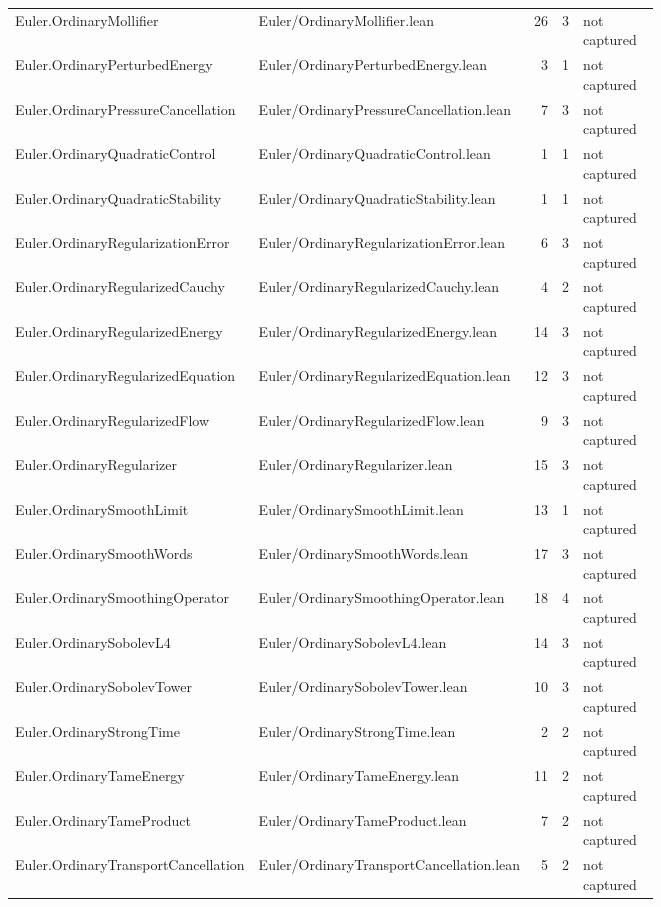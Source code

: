 \documentclass[10pt]{article}
\begin{document}
\begin{longtable}{p{0.28\linewidth}p{0.27\linewidth}r r p{0.20\linewidth}}
Euler.OrdinaryMollifier & Euler/OrdinaryMollifier.lean & 26 & 3 & not captured\\
Euler.OrdinaryPerturbedEnergy & Euler/OrdinaryPerturbedEnergy.lean & 3 & 1 & not captured\\
Euler.OrdinaryPressureCancellation & Euler/OrdinaryPressureCancellation.lean & 7 & 3 & not captured\\
Euler.OrdinaryQuadraticControl & Euler/OrdinaryQuadraticControl.lean & 1 & 1 & not captured\\
Euler.OrdinaryQuadraticStability & Euler/OrdinaryQuadraticStability.lean & 1 & 1 & not captured\\
Euler.OrdinaryRegularizationError & Euler/OrdinaryRegularizationError.lean & 6 & 3 & not captured\\
Euler.OrdinaryRegularizedCauchy & Euler/OrdinaryRegularizedCauchy.lean & 4 & 2 & not captured\\
Euler.OrdinaryRegularizedEnergy & Euler/OrdinaryRegularizedEnergy.lean & 14 & 3 & not captured\\
Euler.OrdinaryRegularizedEquation & Euler/OrdinaryRegularizedEquation.lean & 12 & 3 & not captured\\
Euler.OrdinaryRegularizedFlow & Euler/OrdinaryRegularizedFlow.lean & 9 & 3 & not captured\\
Euler.OrdinaryRegularizer & Euler/OrdinaryRegularizer.lean & 15 & 3 & not captured\\
Euler.OrdinarySmoothLimit & Euler/OrdinarySmoothLimit.lean & 13 & 1 & not captured\\
Euler.OrdinarySmoothWords & Euler/OrdinarySmoothWords.lean & 17 & 3 & not captured\\
Euler.OrdinarySmoothingOperator & Euler/OrdinarySmoothingOperator.lean & 18 & 4 & not captured\\
Euler.OrdinarySobolevL4 & Euler/OrdinarySobolevL4.lean & 14 & 3 & not captured\\
Euler.OrdinarySobolevTower & Euler/OrdinarySobolevTower.lean & 10 & 3 & not captured\\
Euler.OrdinaryStrongTime & Euler/OrdinaryStrongTime.lean & 2 & 2 & not captured\\
Euler.OrdinaryTameEnergy & Euler/OrdinaryTameEnergy.lean & 11 & 2 & not captured\\
Euler.OrdinaryTameProduct & Euler/OrdinaryTameProduct.lean & 7 & 2 & not captured\\
Euler.OrdinaryTransportCancellation & Euler/OrdinaryTransportCancellation.lean & 5 & 2 & not captured\\

\end{longtable}
\end{document}
